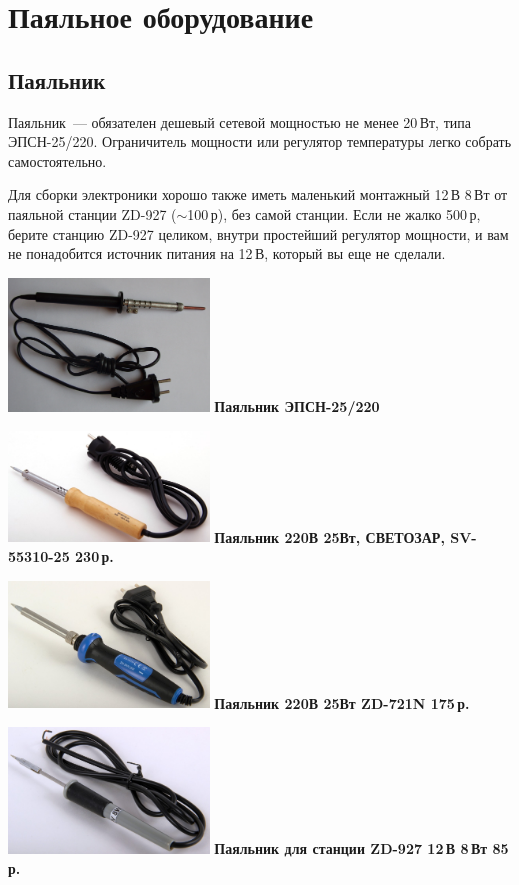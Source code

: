 
\section{Паяльное оборудование}

\subsection{Паяльник}

Паяльник\ --- обязателен дешевый сетевой мощностью не менее 20\,Вт, типа
ЭПСН-25/220. Ограничитель мощности или регулятор температуры легко собрать
самостоятельно.

Для сборки электроники хорошо также иметь маленький монтажный 12\,В 8\,Вт от
паяльной станции ZD-927 ($\sim$100\,р), без самой станции. Если не жалко 500\,р,
берите станцию ZD-927 целиком, внутри простейший регулятор мощности, и вам не
понадобится источник питания на 12\,В, который вы еще не сделали.

\noindent\includegraphics[width=0.4\textwidth]{tech/tools/solder/EPSN25.jpg}
\textbf{Паяльник ЭПСН-25/220}

\noindent\includegraphics[width=0.4\textwidth]{tech/tools/solder/SV-55310-25.jpg}
\textbf{Паяльник 220В 25Вт, СВЕТОЗАР, SV-55310-25 230\,р.}

\noindent\includegraphics[width=0.4\textwidth]{tech/tools/solder/ZD-721N.jpg}
\textbf{Паяльник 220В 25Вт ZD-721N 175\,р.}

\noindent\includegraphics[width=0.4\textwidth]{tech/tools/solder/Iron8W.jpg}
\textbf{Паяльник для станции ZD-927 12\,В 8\,Вт 85\,р.}

